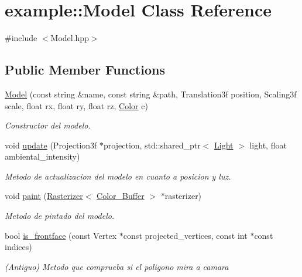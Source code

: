 \hypertarget{classexample_1_1_model}{}\section{example\+::Model Class Reference}
\label{classexample_1_1_model}


{\ttfamily \#include $<$Model.\+hpp$>$}

\subsection*{Public Member Functions}
\begin{DoxyCompactItemize}
\item 
\mbox{\hyperlink{classexample_1_1_model_a6fa0e02fdbf149f9058075fa75175416}{Model}} (const string \&name, const string \&path, Translation3f position, Scaling3f scale, float rx, float ry, float rz, \mbox{\hyperlink{structexample_1_1_color___buffer___rgba8888_1_1_color}{Color}} c)
\begin{DoxyCompactList}\small\item\em Constructor del modelo. \end{DoxyCompactList}\item 
void \mbox{\hyperlink{classexample_1_1_model_a50162748d338240194f9072c3ea452eb}{update}} (Projection3f $\ast$projection, std\+::shared\+\_\+ptr$<$ \mbox{\hyperlink{classexample_1_1_light}{Light}} $>$ light, float ambiental\+\_\+intensity)
\begin{DoxyCompactList}\small\item\em Metodo de actualizacion del modelo en cuanto a posicion y luz. \end{DoxyCompactList}\item 
void \mbox{\hyperlink{classexample_1_1_model_aeadfa130f9617b18f11d992ea2dc07ed}{paint}} (\mbox{\hyperlink{classexample_1_1_rasterizer}{Rasterizer}}$<$ \mbox{\hyperlink{classexample_1_1_color___buffer___rgba8888}{Color\+\_\+\+Buffer}} $>$ $\ast$rasterizer)
\begin{DoxyCompactList}\small\item\em Metodo de pintado del modelo. \end{DoxyCompactList}\item 
bool \mbox{\hyperlink{classexample_1_1_model_a5b038b07484e2b74bc06727e81eb49eb}{is\+\_\+frontface}} (const Vertex $\ast$const projected\+\_\+vertices, const int $\ast$const indices)
\begin{DoxyCompactList}\small\item\em (Antiguo) Metodo que comprueba si el poligono mira a camara \end{DoxyCompactList}\item 

\end{DoxyCompactItemize}
